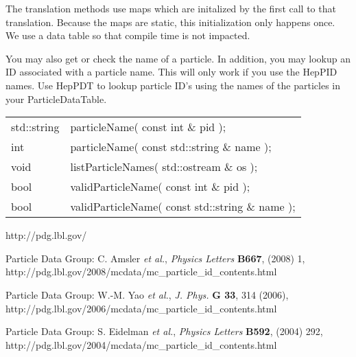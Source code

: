 The translation methods use maps which are initalized by the first call 
to that translation.
Because the maps are static, this initialization only happens once.
We use a data table so that compile time is not impacted.

You may also get or check the name of a particle.  
In addition, you may lookup an ID associated with a particle name.  
This will only work if you use the HepPID names. 
Use HepPDT to lookup particle ID's using the names of the 
particles in your ParticleDataTable.

\begin{center}
\begin{tabular}{ll}
std::string &  particleName( const int \& pid ); \\
int         &  particleName( const std::string \& name ); \\
void        &  listParticleNames( std::ostream \& os ); \\
bool        &  validParticleName( const int \& pid ); \\
bool        &  validParticleName( const std::string \& name ); \\
\end{tabular}
\end{center}

\def\etal{{\it et al.}}

\begin{thebibliography}{9}

http://pdg.lbl.gov/ 

Particle Data Group: C. Amsler \etal, \emph{Physics Letters} \textbf{B667}, (2008) 1,
\newline
http://pdg.lbl.gov/2008/mcdata/mc\_particle\_id\_contents.html

Particle Data Group: W.-M. Yao \etal, \emph{J. Phys.} \textbf{G 33}, 314 (2006),
\newline
http://pdg.lbl.gov/2006/mcdata/mc\_particle\_id\_contents.html

Particle Data Group: S. Eidelman  \etal, \emph{Physics Letters} \textbf{B592}, (2004) 292, 
\newline
http://pdg.lbl.gov/2004/mcdata/mc\_particle\_id\_contents.html

\end{thebibliography}

\newpage

